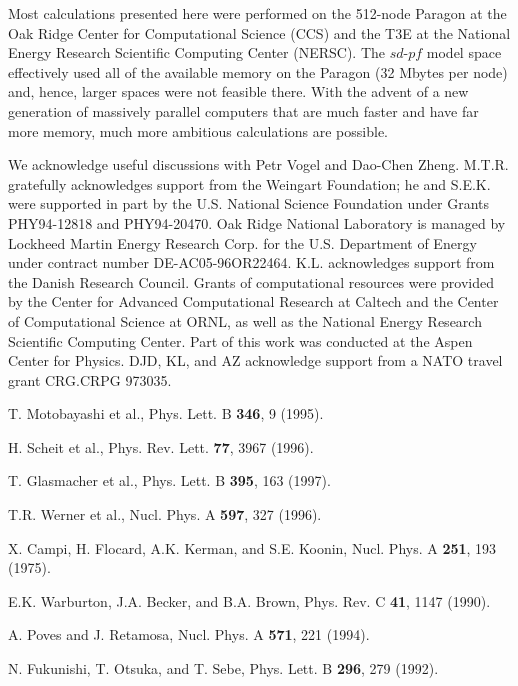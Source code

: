 \begin{multicols}{2}
Most calculations presented here were
performed on the 512-node Paragon at the Oak Ridge Center for
Computational Science (CCS) and the T3E at the National Energy
Research Scientific Computing Center (NERSC). The $sd$-$pf$ model
space effectively used all of the available memory on the Paragon (32
Mbytes per node) and, hence, larger spaces were not feasible there.
With the advent of a new generation of massively parallel computers
that are much faster and have far more memory, much more ambitious
calculations are possible.



\acknowledgements
We acknowledge useful discussions with Petr Vogel and Dao-Chen Zheng.
M.T.R. gratefully acknowledges support from the Weingart
Foundation; he and S.E.K. were supported in part by
the U.S. National Science Foundation
under Grants PHY94-12818 and PHY94-20470.
Oak Ridge National Laboratory is managed by Lockheed Martin Energy
Research Corp. for the U.S. Department of Energy under contract number
DE-AC05-96OR22464.
K.L. acknowledges support from the Danish Research Council.
Grants of computational resources were provided by the Center
for Advanced Computational Research at Caltech and the
Center of Computational Science at ORNL, as well as
the National Energy Research Scientific Computing Center.
Part of this work was conducted at the Aspen Center for Physics.
DJD, KL, and AZ acknowledge support from a NATO travel grant
CRG.CRPG 973035.

\begin{references}

 T. Motobayashi et al.,
Phys. Lett. B {\bf 346},
9 (1995).

 H. Scheit et al., Phys. Rev. Lett. {\bf 77},
3967 (1996).

 T. Glasmacher et al.,  Phys. Lett. B {\bf 395},
163 (1997).

 T.R. Werner et al., Nucl. Phys. A {\bf 597},
327 (1996).

 X. Campi, H. Flocard, A.K. Kerman, and S.E. Koonin,
Nucl. Phys. A {\bf 251}, 193 (1975).

 E.K. Warburton, J.A. Becker, and B.A. Brown, Phys.
 Rev. C {\bf 41}, 1147 (1990).

 A. Poves and J. Retamosa, Nucl. Phys. A {\bf 571},
221 (1994).

 N. Fukunishi, T. Otsuka, and T. Sebe,
Phys. Lett. B {\bf 296}, 279 (1992).


\end{references}
\end{multicols}
